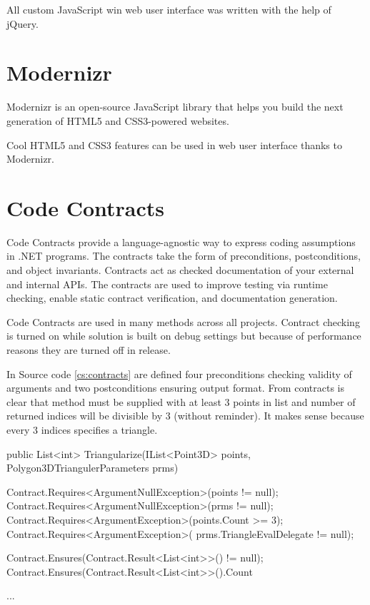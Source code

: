 All custom JavaScript win web user interface was written with the help of jQuery.


\section{Modernizr}
\label{sec:Modernizr}

\noindent
Modernizr is an open-source JavaScript library that helps you build the next generation of HTML5 and CSS3-powered websites.

Cool HTML5 and CSS3 features can be used in web user interface thanks to Modernizr.


\section{Code Contracts}
\label{sec:CodeContracts}

\noindent
Code Contracts provide a language-agnostic way to express coding assumptions in .NET programs.
The contracts take the form of preconditions, postconditions, and object invariants.
Contracts act as checked documentation of your external and internal APIs.
The contracts are used to improve testing via runtime checking, enable static contract verification, and documentation generation.

Code Contracts are used in many methods across all projects.
Contract checking is turned on while solution is built on debug settings but because of performance reasons they are turned off in release.

In Source code \ref{cs:contracts} are defined four preconditions checking validity of arguments and two postconditions ensuring output format.
From contracts is clear that method must be supplied with at least 3 points in list and number of returned indices will be divisible by 3 (without reminder).
It makes sense because every 3 indices specifies a triangle.


\begin{Csharp}[label=cs:contracts,caption={Example of code contracts in the \emph{Triangularize} method of the \emph{Polygon3DTrianguler} class.}]
public List<int> Triangularize(IList<Point3D> points,
		Polygon3DTriangulerParameters prms) {
		
	Contract.Requires<ArgumentNullException>(points != null);
	Contract.Requires<ArgumentNullException>(prms != null);
	Contract.Requires<ArgumentException>(points.Count >= 3);
	Contract.Requires<ArgumentException>(
		prms.TriangleEvalDelegate != null);
		
	Contract.Ensures(Contract.Result<List<int>>() != null);
	Contract.Ensures(Contract.Result<List<int>>().Count %

	...	
}
\end{Csharp}



